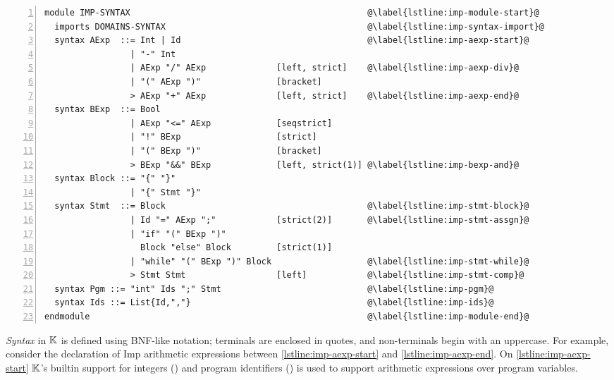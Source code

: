 \begin{lstlisting}[float=ht,
  frame=single,
  style=ksty,
  language=k,
  numbers=left,
  numbersep=5pt,
  caption={Imp Syntax in $\K$},
  label={lst:imp-syntax},
  xleftmargin=3ex
]
module IMP-SYNTAX                                               @\label{lstline:imp-module-start}@
  imports DOMAINS-SYNTAX                                        @\label{lstline:imp-syntax-import}@
  syntax AExp  ::= Int | Id                                     @\label{lstline:imp-aexp-start}@
                 | "-" Int
                 | AExp "/" AExp              [left, strict]    @\label{lstline:imp-aexp-div}@
                 | "(" AExp ")"               [bracket]
                 > AExp "+" AExp              [left, strict]    @\label{lstline:imp-aexp-end}@
  syntax BExp  ::= Bool
                 | AExp "<=" AExp             [seqstrict]
                 | "!" BExp                   [strict]
                 | "(" BExp ")"               [bracket]
                 > BExp "&&" BExp             [left, strict(1)] @\label{lstline:imp-bexp-and}@
  syntax Block ::= "{" "}"
                 | "{" Stmt "}"
  syntax Stmt  ::= Block                                        @\label{lstline:imp-stmt-block}@
                 | Id "=" AExp ";"            [strict(2)]       @\label{lstline:imp-stmt-assgn}@
                 | "if" "(" BExp ")"
                   Block "else" Block         [strict(1)]
                 | "while" "(" BExp ")" Block                   @\label{lstline:imp-stmt-while}@
                 > Stmt Stmt                  [left]            @\label{lstline:imp-stmt-comp}@
  syntax Pgm ::= "int" Ids ";" Stmt                             @\label{lstline:imp-pgm}@
  syntax Ids ::= List{Id,","}                                   @\label{lstline:imp-ids}@
endmodule                                                       @\label{lstline:imp-module-end}@
\end{lstlisting}

\emph{Syntax} in $\mathbb{K}{}$ is defined using BNF-like notation; terminals are enclosed
in quotes, and non-terminals begin with an uppercase. For example,
consider the declaration of Imp arithmetic expressions between
\autoref{lstline:imp-aexp-start} and \autoref{lstline:imp-aexp-end}. On
\autoref{lstline:imp-aexp-start} $\mathbb{K}$'s builtin support
for integers () and program identifiers
() is used to support arithmetic expressions over program variables.

